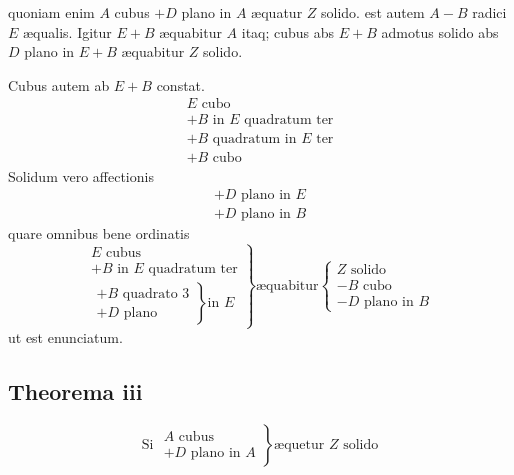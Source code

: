 \documentclass[11pt,a4paper]{article}
\begin{document}
quoniam enim $A$ cubus $+ D$ plano in $A$ æquatur $Z$ solido. est autem $A - B$ radici $E$ æqualis. Igitur $E + B$ æquabitur $A$ itaq; cubus abs $E + B$ admotus solido abs $D$ plano in $E + B$ æquabitur $Z$ solido.

Cubus autem ab $E + B$ constat.
\[ \begin{array}{l} E \text{ cubo} \\ + B \text{ in } E \text{ quadratum ter} \\ + B \text{ quadratum in } E \text{ ter} \\ + B \text{ cubo} \end{array} \]
Solidum vero affectionis
\[ \begin{array}{l} + D \text{ plano in } E \\ + D \text{ plano in } B \end{array} \]
quare omnibus bene ordinatis
\[ \left.\begin{array}{l} E \text{ cubus} \\ + B \text{ in } E \text{ quadratum ter} \\ \left.\begin{array}{l} + B \text{ quadrato } 3 \\ + D \text{ plano} \end{array}\right\} \text{in } E \end{array}\right\} \text{æquabitur} \left\{\begin{array}{l} Z \text{ solido} \\ - B \text{ cubo} \\ - D \text{ plano in } B \end{array}\right. \]
ut est enunciatum.


\subsection*{Theorema iii}

\[ \text{Si } \left.\begin{array}{l} A \text{ cubus} \\ + D \text{ plano in } A \end{array}\right\} \text{æquetur } Z \text{ solido} \]
\end{document}
